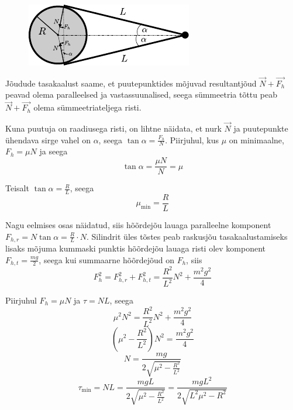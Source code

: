 \documentclass[11pt,a5paper]{article}
\begin{document}
\begin{figure}[h]
\centering
\includegraphics[width=0.5\linewidth]{pulgad_lah_joon.pdf}
\end{figure}

Jõudude tasakaalust saame, et puutepunktides mõjuvad resultantjõud $\vec N + \vec{F_h}$ peavad olema paralleelsed ja vastassuunalised, seega sümmeetria tõttu peab $\vec N + \vec{F_h}$ olema sümmeetriateljega risti.

Kuna puutuja on raadiusega risti, on lihtne näidata, et nurk $\vec N$ ja puutepunkte ühendava sirge vahel on $\alpha$, seega $\tan \alpha = \frac{F_h}{N}$. Piirjuhul, kus $\mu$ on minimaalne, $F_h = \mu N$ ja seega
$$\tan \alpha = \frac{\mu N}{N} = \mu$$

Teisalt $\tan \alpha = \frac{R}{L}$, seega
$$\mu_\text{min} = \frac{R}{L}$$

\osa Nagu eelmises osas näidatud, siis hõõrdejõu lauaga paralleelne komponent $F_{h,r} = N\tan \alpha = \frac{R}{L}\cdot N$. Silindrit üles tõstes peab raskusjõu tasakaalustamiseks lisaks mõjuma kummaski punktis hõõrdejõu lauaga risti olev komponent $F_{h,t} = \frac{mg}{2}$, seega kui summaarne hõõrdejõud on $F_h$, siis
$$F_h^2 = F_{h,r}^2 + F_{h,t}^2 = \frac{R^2}{L^2}N^2 + \frac{m^2g^2}{4}$$

Piirjuhul $F_h = \mu N$ ja $\tau = NL$, seega
$$\mu^2N^2 = \frac{R^2}{L^2}N^2 + \frac{m^2g^2}{4}$$
$$\left(\mu^2 - \frac{R^2}{L^2}\right)N^2 = \frac{m^2g^2}{4}$$
$$N = \frac{mg}{2\sqrt{\mu^2-\frac{R^2}{L^2}}}$$
$$\tau_\text{min} = NL = \frac{mgL}{2\sqrt{\mu^2-\frac{R^2}{L^2}}} = \frac{mgL^2}{2\sqrt{L^2\mu^2 - R^2}}$$
\end{document}
